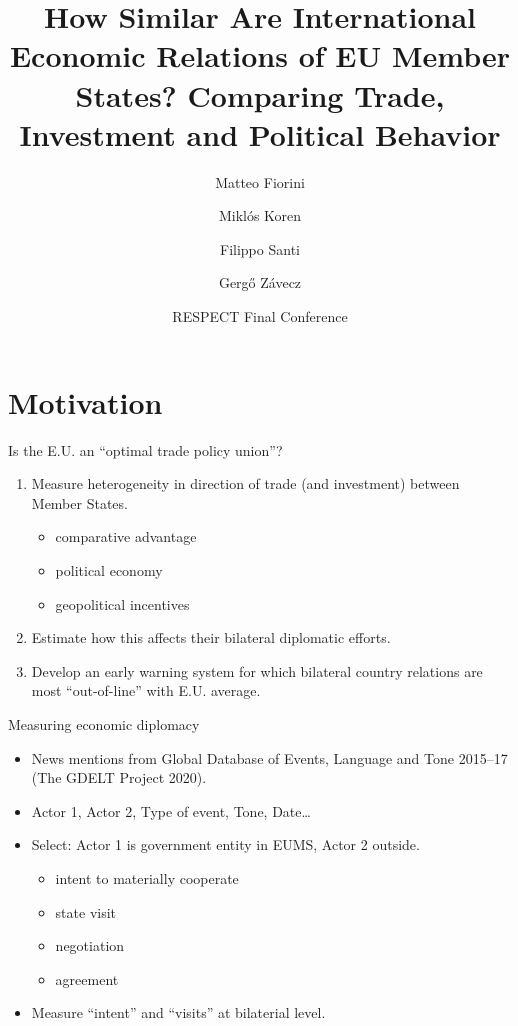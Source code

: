 \documentclass[
  ignorenonframetext,
  aspectratio=16,
]{beamer}
\title{How Similar Are International Economic Relations of EU Member
States? Comparing Trade, Investment and Political Behavior}
\author{Matteo Fiorini \and Miklós Koren \and Filippo Santi \and Gergő
Závecz}
\date{RESPECT Final Conference}
\providecommand{\tightlist}{%
  \setlength{\itemsep}{0pt}\setlength{\parskip}{0pt}}
\begin{document}
\frame{\titlepage}

\hypertarget{motivation}{%
\section{Motivation}\label{motivation}}

\begin{frame}{Is the E.U. an ``optimal trade policy union''?}
\protect\hypertarget{is-the-e.u.-an-optimal-trade-policy-union}{}
\begin{enumerate}
\tightlist
\item
  Measure heterogeneity in direction of trade (and investment) between
  Member States.

  \begin{itemize}
  \tightlist
  \item
    comparative advantage
  \item
    political economy
  \item
    geopolitical incentives
  \end{itemize}
\item
  Estimate how this affects their bilateral diplomatic efforts.
\item
  Develop an early warning system for which bilateral country relations
  are most ``out-of-line'' with E.U. average.
\end{enumerate}
\end{frame}

\begin{frame}{Measuring economic diplomacy}
\protect\hypertarget{measuring-economic-diplomacy}{}
\begin{itemize}
\tightlist
\item
  News mentions from Global Database of Events, Language and Tone
  2015--17 (The GDELT Project 2020).
\item
  Actor 1, Actor 2, Type of event, Tone, Date\ldots{}
\item
  Select: Actor 1 is government entity in EUMS, Actor 2 outside.

  \begin{itemize}
  \tightlist
  \item
    intent to materially cooperate
  \item
    state visit
  \item
    negotiation
  \item
    agreement
  \end{itemize}
\item
  Measure ``intent'' and ``visits'' at bilaterial level.
\end{itemize}
\end{frame}
\end{document}
